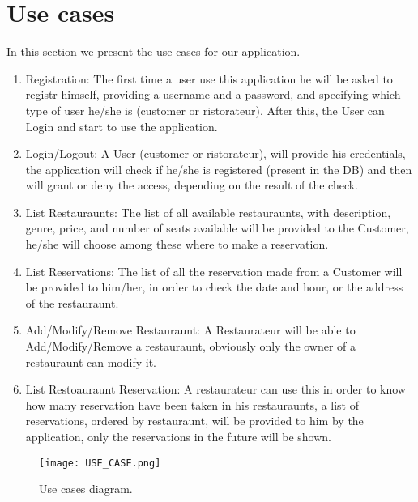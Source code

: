 \section{Use cases}
	In this section we present the use cases for our application.
	\begin{enumerate}
		\item Registration: The first time a user use this application he will be asked to registr himself, providing a username and a password, and specifying which type of user he/she is (customer or ristorateur).
		After this, the User can Login and start to use the application.
		\item Login/Logout: A User (customer or ristorateur), will provide his credentials, the application will check if he/she is registered (present in the DB) and then will grant or deny the access, depending on the result of the check.
		\item List Restauraunts: The list of all available restauraunts, with description, genre, price, and number of seats available will be provided to the Customer, he/she will choose among these where to make a reservation.
		\item List Reservations: The list of all the reservation made from a Customer will be provided to him/her, in order to check the date and hour, or the address of the restauraunt.
		\item Add/Modify/Remove Restauraunt: A Restaurateur will be able to Add/Modify/Remove a restauraunt, obviously only the owner of a restauraunt can modify it.
		\item List Restoauraunt Reservation: A restaurateur can use this in order to know how many reservation have been taken in his restauraunts, a list of reservations, ordered by restauraunt, will be provided to him by the application, only the reservations in the future will be shown.
	\end{enumerate}

\begin{figure}
  \texttt{[image: USE\_CASE.png]}
  \caption{Use cases diagram.}
  \label{figureUSE_CASE}
\end{figure}

\pagebreak